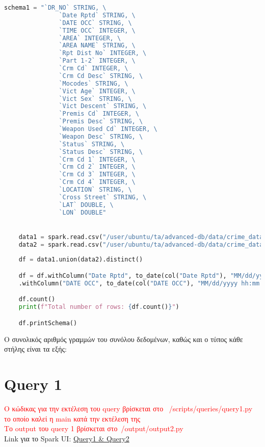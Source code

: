 \documentclass{article}
\begin{document}
\begin{lstlisting}[language = Python]
    schema1 = "`DR_NO` STRING, \
               `Date Rptd` STRING, \
               `DATE OCC` STRING, \
               `TIME OCC` INTEGER, \
               `AREA` INTEGER, \
               `AREA NAME` STRING, \
               `Rpt Dist No` INTEGER, \
               `Part 1-2` INTEGER, \
               `Crm Cd` INTEGER, \
               `Crm Cd Desc` STRING, \
               `Mocodes` STRING, \
               `Vict Age` INTEGER, \
               `Vict Sex` STRING, \
               `Vict Descent` STRING, \
               `Premis Cd` INTEGER, \
               `Premis Desc` STRING, \
               `Weapon Used Cd` INTEGER, \
               `Weapon Desc` STRING, \
               `Status` STRING, \
               `Status Desc` STRING, \
               `Crm Cd 1` INTEGER, \
               `Crm Cd 2` INTEGER, \
               `Crm Cd 3` INTEGER, \
               `Crm Cd 4` INTEGER, \
               `LOCATION` STRING, \
               `Cross Street` STRING, \
               `LAT` DOUBLE, \
               `LON` DOUBLE"


    data1 = spark.read.csv("/user/ubuntu/ta/advanced-db/data/crime_data_2010.csv", header=True, schema=schema1)
    data2 = spark.read.csv("/user/ubuntu/ta/advanced-db/data/crime_data_2020.csv", header=True, schema=schema1)
    
    df = data1.union(data2).distinct()

    df = df.withColumn("Date Rptd", to_date(col("Date Rptd"), "MM/dd/yyyy hh:mm:ss a")) \
    .withColumn("DATE OCC", to_date(col("DATE OCC"), "MM/dd/yyyy hh:mm:ss a"))

    df.count()
    print(f"Total number of rows: {df.count()}")

    df.printSchema()
\end{lstlisting}


\vspace{1\baselineskip}

Ο συνολικός αριθμός γραμμών του συνόλου δεδομένων, καθώς και ο τύπος κάθε στήλης είναι τα εξής:


\section{Query 1}

\textcolor{red}{Ο κώδικας για την εκτέλεση του query βρίσκεται στο  /scripts/queries/query1.py το οποίο καλεί η main κατά την εκτέλεση της} \\
\textcolor{red}{Το output του query 1 βρίσκεται στο /output/output2.py} \\
Link για το Spark UI:
\href{http://83.212.81.191:18080/history/application_1705357398960_0013/jobs/}{Query1 \& Query2} \\
\end{document}
